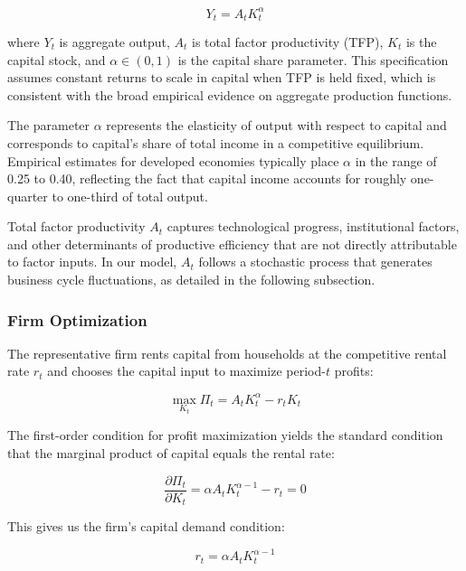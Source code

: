 \documentclass[5p,authoryear]{elsarticle}
\begin{document}
\begin{equation}
Y_t = A_t K_t^{\alpha}
\label{eq:production_function}
\end{equation}

where $Y_t$ is aggregate output, $A_t$ is total factor productivity (TFP), $K_t$ is the capital stock, and $\alpha \in (0,1)$ is the capital share parameter. This specification assumes constant returns to scale in capital when TFP is held fixed, which is consistent with the broad empirical evidence on aggregate production functions.

The parameter $\alpha$ represents the elasticity of output with respect to capital and corresponds to capital's share of total income in a competitive equilibrium. Empirical estimates for developed economies typically place $\alpha$ in the range of 0.25 to 0.40, reflecting the fact that capital income accounts for roughly one-quarter to one-third of total output.

Total factor productivity $A_t$ captures technological progress, institutional factors, and other determinants of productive efficiency that are not directly attributable to factor inputs. In our model, $A_t$ follows a stochastic process that generates business cycle fluctuations, as detailed in the following subsection.

\subsubsection{Firm Optimization}

The representative firm rents capital from households at the competitive rental rate $r_t$ and chooses the capital input to maximize period-$t$ profits:

\begin{equation}
\max_{K_t} \Pi_t = A_t K_t^{\alpha} - r_t K_t
\label{eq:firm_profit}
\end{equation}

The first-order condition for profit maximization yields the standard condition that the marginal product of capital equals the rental rate:

\begin{equation}
\frac{\partial \Pi_t}{\partial K_t} = \alpha A_t K_t^{\alpha-1} - r_t = 0
\label{eq:firm_foc}
\end{equation}

This gives us the firm's capital demand condition:

\begin{equation}
r_t = \alpha A_t K_t^{\alpha-1}
\label{eq:rental_rate}
\end{equation}
\end{document}
